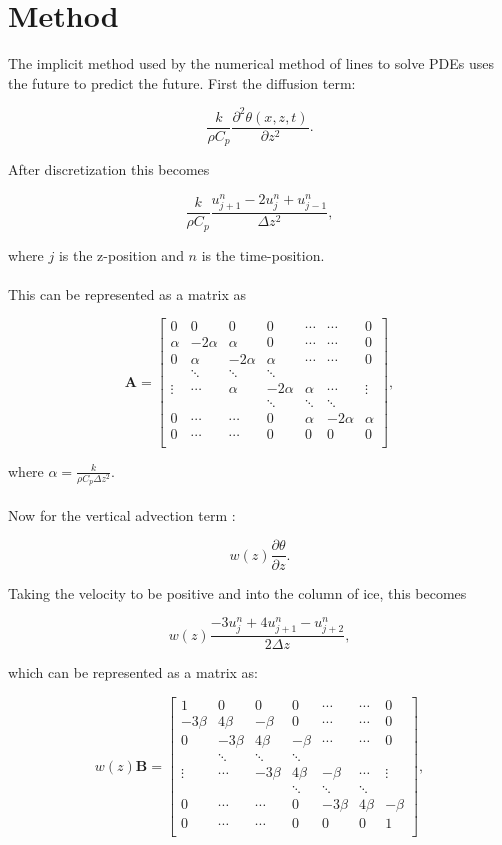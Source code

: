 \documentclass{article}%
\begin{document}
\section{Method}

The implicit method used by the numerical method of lines to solve PDEs uses the future to predict the future.  First the diffusion term:

$$\frac{k}{\rho C_p} \frac{\partial ^2 \theta(x, z, t)}{\partial z^2}.$$

\noindent After discretization this becomes

$$\frac{k}{\rho C_p} \frac{u_{j+1}^n - 2u_j^n + u_{j-1}^n}{\Delta z^2},$$

where $j$ is the z-position and $n$ is the time-position.\\
\\
\noindent This can be represented as a matrix as

$$\mathbf{A} = 
\begin{bmatrix}
  0 &0 &0 &0 &\cdots &\cdots &0 \\
  \alpha &-2\alpha &\alpha &0 &\cdots &\cdots &0 \\
  0 &\alpha &-2\alpha &\alpha & \cdots &\cdots &0 \\
  &\ddots & \ddots &\ddots  & & & \\
  \vdots &\cdots &\alpha &-2\alpha &\alpha  &\cdots &\vdots \\
  & & &\ddots &\ddots &\ddots &\\
  0 & \cdots &\cdots &0 &\alpha &-2\alpha &\alpha \\
  0 & \cdots &\cdots &0 &0 &0 &0 \\
\end{bmatrix},$$

where $\alpha = \frac{k}{\rho C_p \Delta z^2}$.\\
\\
\noindent Now for the vertical advection term :

$$w(z)\frac {\partial \theta}{\partial z}.$$

\noindent Taking the velocity to be positive and into the column of ice, this becomes

$$w(z)\frac{-3u_{j}^n + 4u_{j+1}^n - u_{j+2}^n}{2\Delta z},$$

which can be represented as a matrix as:

$$w(z)\mathbf{B} = 
\begin{bmatrix}
  1 &0 &0 &0 &\cdots &\cdots &0 \\
  -3\beta &4\beta &-\beta &0 &\cdots &\cdots &0 \\
  0 &-3\beta &4\beta &-\beta & \cdots &\cdots &0 \\
  &\ddots & \ddots &\ddots  & & & \\
  \vdots &\cdots &-3\beta &4\beta &-\beta  &\cdots &\vdots \\
  & & &\ddots &\ddots &\ddots &\\
  0 & \cdots &\cdots &0 &-3\beta &4\beta &-\beta \\
  0 & \cdots &\cdots &0 &0 &0 &1 \\
\end{bmatrix},$$
\end{document}
